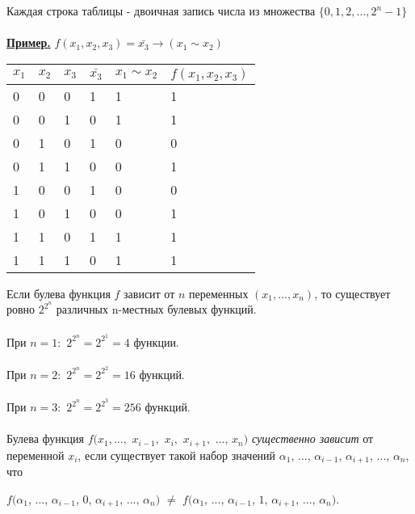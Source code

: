 \documentclass{article}
\begin{document}
	Каждая строка таблицы - двоичная запись числа из множества $\{0, 1, 2, ..., 2^n - 1\}$
	\\\\
	\underline{\textbf{Пример.}} $f (x_1, x_2, x_3) = \bar{x_3} \rightarrow (x_1 \sim x_2)$\\

	\begin{table}[ht]
		\begin{tabular}{|l|l|l|l|l|l|}
			\hline
			\rowcolor[HTML]{E2C8E4} 
			$x_1$ & $x_2$ & $x_3$ & $\bar{x_3}$ & $x_1 \sim x_2$ & $f(x_1, x_2, x_3)$ \\ \hline
			\rowcolor[HTML]{D5D7A5} 
			0     & 0     & 0     & 1           & 1              & 1                  \\ \hline
			\rowcolor[HTML]{D5D7A5} 
			0     & 0     & 1     & 0           & 1              & 1                  \\ \hline
			\rowcolor[HTML]{D5D7A5} 
			0     & 1     & 0     & 1           & 0              & 0                  \\ \hline
			\rowcolor[HTML]{D5D7A5} 
			0     & 1     & 1     & 0           & 0              & 1                  \\ \hline
			\rowcolor[HTML]{C9E4C5} 
			1     & 0     & 0     & 1           & 0              & 0                  \\ \hline
			\rowcolor[HTML]{C9E4C5} 
			1     & 0     & 1     & 0           & 0              & 1                  \\ \hline
			\rowcolor[HTML]{C9E4C5} 
			1     & 1     & 0     & 1           & 1              & 1                  \\ \hline
			\rowcolor[HTML]{C9E4C5} 
			1     & 1     & 1     & 0           & 1              & 1                  \\ \hline
		\end{tabular}
	\end{table}

	Если булева функция $f$ зависит от $n$ переменных $(x_1, ..., x_n)$, то существует ровно $2^{2^n}$
	различных n-местных булевых функций.
	\\\\
	При $n = 1:$ \qquad $2^{2^n} = 2^{2^1} = 4$ функции.
	\\\\
	При $n = 2:$ \qquad $2^{2^n} = 2^{2^2} = 16$ функций.
	\\\\
	При $n = 3:$ \qquad $2^{2^n} = 2^{2^3} = 256$ функций.
	\\\\
	Булева функция $f (x_1, ...,$ $x_{i-1},$ $x_i,$ $x_{i+1},$ $...$, $ x_n)$
	\textit{существенно зависит} от переменной $x_i$, если существует такой набор значений
	$\alpha_1$, $...$, $\alpha_{i-1}$, $\alpha_{i+1}$, $...$, $\alpha_n$, что
	\begin{center}
	$f(\alpha_1$, $...$, $\alpha_{i-1}$, $0$, $\alpha_{i+1}$, $...$, $\alpha_n)$ $\neq$
	$f(\alpha_1$, $...$, $\alpha_{i-1}$, $1$, $\alpha_{i+1}$, $...$, $\alpha_n).$
	\end{center}
\end{document}
